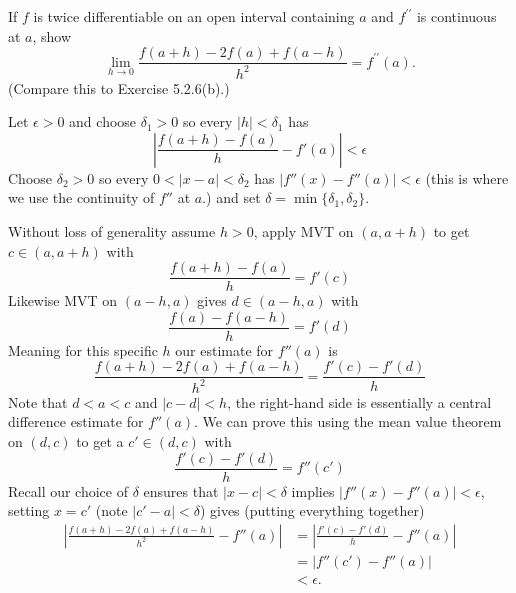 \begin{exercise}
  If $f$ is twice differentiable on an open interval containing $a$ and $f^{\prime \prime}$ is continuous at $a$, show
  $$
  \lim _{h \rightarrow 0} \frac{f(a+h)-2 f(a)+f(a-h)}{h^{2}}=f^{\prime \prime}(a) .
  $$
  (Compare this to Exercise 5.2.6(b).)
\end{exercise}
\begin{solution}
  Let $\epsilon > 0$ and choose $\delta_1 > 0$ so every $|h| < \delta_1$ has 
  $$
  \left|\frac{f(a+h) - f(a)}{h} - f'(a)\right| < \epsilon
  $$
  Choose $\delta_2 > 0$ so every $0<|x-a|<\delta_2$ has $|f''(x)-f''(a)|<\epsilon$ (this is where we use the continuity of $f''$ at $a$.) and set $\delta = \min\{\delta_1,\delta_2\}$.

  Without loss of generality assume $h > 0$, apply MVT on $(a,a+h)$ to get $c \in (a,a+h)$ with
  $$
  \frac{f(a+h) - f(a)}{h} = f'(c)
  $$
  Likewise MVT on $(a-h,a)$ gives $d \in (a-h,a)$ with
  $$
  \frac{f(a) - f(a-h)}{h} = f'(d)
  $$
  Meaning for this specific $h$ our estimate for $f''(a)$ is
  $$
  \frac{f(a+h)-2 f(a)+f(a-h)}{h^{2}} = \frac{f'(c) - f'(d)}{h}
  $$
  Note that $d < a < c$ and $|c-d| < h$, the right-hand side is essentially a central difference estimate for $f''(a)$. We can prove this using the mean value theorem on $(d,c)$ to get a $c' \in (d,c)$ with
  $$
  \frac{f'(c) - f'(d)}{h} = f''(c')
  $$
  Recall our choice of $\delta$ ensures that $|x-c|<\delta$ implies $|f''(x)-f''(a)|<\epsilon$, setting $x=c'$ (note $|c'-a|<\delta$) gives (putting everything together)
  $$
  \begin{aligned}
  \left|\frac{f(a+h)-2 f(a)+f(a-h)}{h^{2}} - f''(a)\right| 
  &= \left|\frac{f'(c) - f'(d)}{h} - f''(a)\right| \\
  &= \left|f''(c') - f''(a)\right| \\
  &< \epsilon.
  \end{aligned}
  $$
\end{solution}

